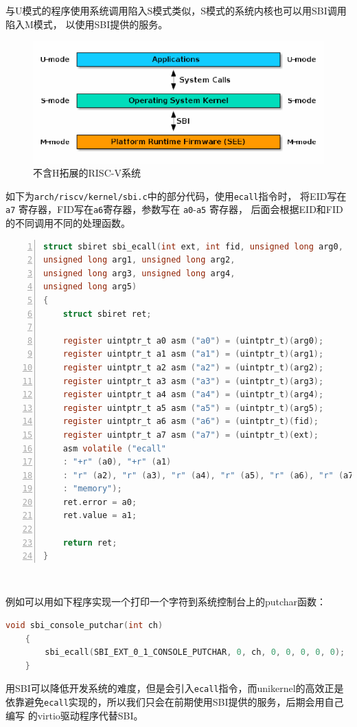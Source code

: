 \documentclass[UTF8,fontset=none,linespread=1.15]{ctexart}
\begin{document}
与U模式的程序使用系统调用陷入S模式类似，S模式的系统内核也可以用SBI调用陷入M模式，
以使用SBI提供的服务。

\begin{figure}[tbh!]
\centering
\includegraphics[width=0.7\linewidth]{assets/RISCV-SBI}
\caption{不含H拓展的RISC-V系统}
\label{fig:riscv-sbi}
\end{figure}

如下为\texttt{arch/riscv/kernel/sbi.c}中的部分代码，使用\texttt{ecall}指令时，
将EID写在\texttt{a7} 寄存器，FID写在\texttt{a6}寄存器，参数写在 \texttt{a0}-\texttt{a5} 寄存器，
后面会根据EID和FID的不同调用不同的处理函数。
\begin{lstlisting}[language=C,numbers=left]
struct sbiret sbi_ecall(int ext, int fid, unsigned long arg0,
unsigned long arg1, unsigned long arg2,
unsigned long arg3, unsigned long arg4,
unsigned long arg5)
{
	struct sbiret ret;

	register uintptr_t a0 asm ("a0") = (uintptr_t)(arg0);
	register uintptr_t a1 asm ("a1") = (uintptr_t)(arg1);
	register uintptr_t a2 asm ("a2") = (uintptr_t)(arg2);
	register uintptr_t a3 asm ("a3") = (uintptr_t)(arg3);
	register uintptr_t a4 asm ("a4") = (uintptr_t)(arg4);
	register uintptr_t a5 asm ("a5") = (uintptr_t)(arg5);
	register uintptr_t a6 asm ("a6") = (uintptr_t)(fid);
	register uintptr_t a7 asm ("a7") = (uintptr_t)(ext);
	asm volatile ("ecall"
	: "+r" (a0), "+r" (a1)
	: "r" (a2), "r" (a3), "r" (a4), "r" (a5), "r" (a6), "r" (a7)
	: "memory");
	ret.error = a0;
	ret.value = a1;

	return ret;
}
\end{lstlisting}​

例如可以用如下程序实现一个打印一个字符到系统控制台上的putchar函数：
\begin{lstlisting}[language=C]
    void sbi_console_putchar(int ch)
    {
    	sbi_ecall(SBI_EXT_0_1_CONSOLE_PUTCHAR, 0, ch, 0, 0, 0, 0, 0);
    }
\end{lstlisting}

用SBI可以降低开发系统的难度，但是会引入\texttt{ecall}指令，而unikernel的高效正是
依靠避免\texttt{ecall}实现的，所以我们只会在前期使用SBI提供的服务，后期会用自己编写
的virtio驱动程序代替SBI。
\end{document}
